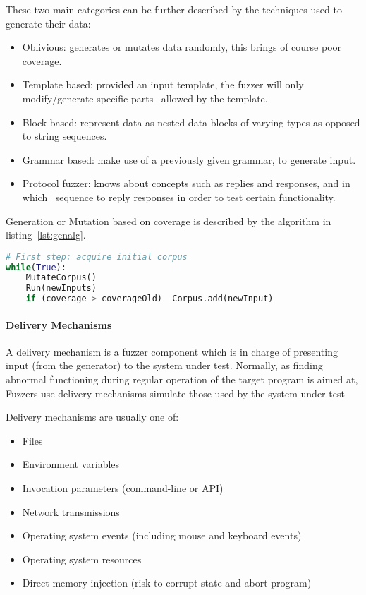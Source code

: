 These two main categories can be further described by the techniques used to generate their data: 

\begin{itemize}
    \item Oblivious: generates or mutates data randomly, this brings of course poor coverage.
    \item Template based: provided an input template, the fuzzer will only modify/generate specific parts \
    allowed by the template.
    \item Block based: represent data as nested data blocks of varying types as opposed to string sequences.
    \item Grammar based: make use of a previously given grammar, to generate input. 
    \item Protocol fuzzer: knows about concepts such as replies and responses, and in which \
    sequence to reply responses in order to test certain functionality.  
\end{itemize}

Generation or Mutation based on coverage is described by the algorithm in listing~\ref{lst:genalg}.

\begin{lstlisting}[caption={Coverage based data generation}, label={lst:genalg}, language=python]
# First step: acquire initial corpus
while(True):
    MutateCorpus()
    Run(newInputs)
    if (coverage > coverageOld)  Corpus.add(newInput)

\end{lstlisting}


\paragraph{Delivery Mechanisms}

A delivery mechanism is a fuzzer component which is in charge of presenting input (from the generator) 
to the system under test. Normally, as finding abnormal functioning during regular operation of the
target program is aimed at, Fuzzers use delivery mechanisms simulate those used by the system under test \cite{mcnally12}

Delivery mechanisms are usually one of:

\begin{itemize}
    \item Files
    \item Environment variables
    \item Invocation parameters (command-line or API)
    \item Network transmissions
    \item Operating system events (including mouse and keyboard events)
    \item Operating system resources 
    \item Direct memory injection (risk to corrupt state and abort program)
\end{itemize}

